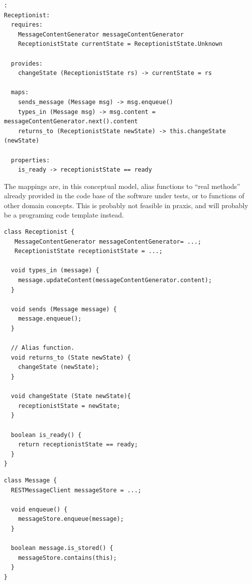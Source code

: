 \begin{lstlisting}[caption=example language for mapping concepts,label={lst:mapping_language_concept}]:
Receptionist:
  requires:
    MessageContentGenerator messageContentGenerator
    ReceptionistState currentState = ReceptionistState.Unknown
  
  provides:
    changeState (ReceptionistState rs) -> currentState = rs
  
  maps:
    sends_message (Message msg) -> msg.enqueue()
    types_in (Message msg) -> msg.content = messageContentGenerator.next().content
    returns_to (ReceptionistState newState) -> this.changeState (newState)

  properties:
    is_ready -> receptionistState == ready
\end{lstlisting}
The mappings are, in this conceptual model, alias functions to ``real methods'' already provided in the code base of the software under tests, or to functions of other domain concepts. This is probably not feasible in praxis, and will probably be a programing code template instead.

\begin{lstlisting}[caption=Pseudo code representing Receptionist domain actor,label={lst:code_for_receptionist_domain_actor}]
class Receptionist {
   MessageContentGenerator messageContentGenerator= ...;
   ReceptionistState receptionistState = ...;
  
  void types_in (message) {
  	message.updateContent(messageContentGenerator.content);
  }
  
  void sends (Message message) {
    message.enqueue();
  }
  
  // Alias function.
  void returns_to (State newState) {
  	changeState (newState);
  }
  
  void changeState (State newState){
  	receptionistState = newState;
  }
  
  boolean is_ready() {
    return receptionistState == ready;
  }
}
\end{lstlisting}

\begin{lstlisting}[caption=Pseudo code representing Message domain concept,label={lst:code_for_domain_concept}]
class Message {
  RESTMessageClient messageStore = ...;
  
  void enqueue() {
    messageStore.enqueue(message);
  }

  boolean message.is_stored() {
    messageStore.contains(this);
  }
}
\end{lstlisting}

